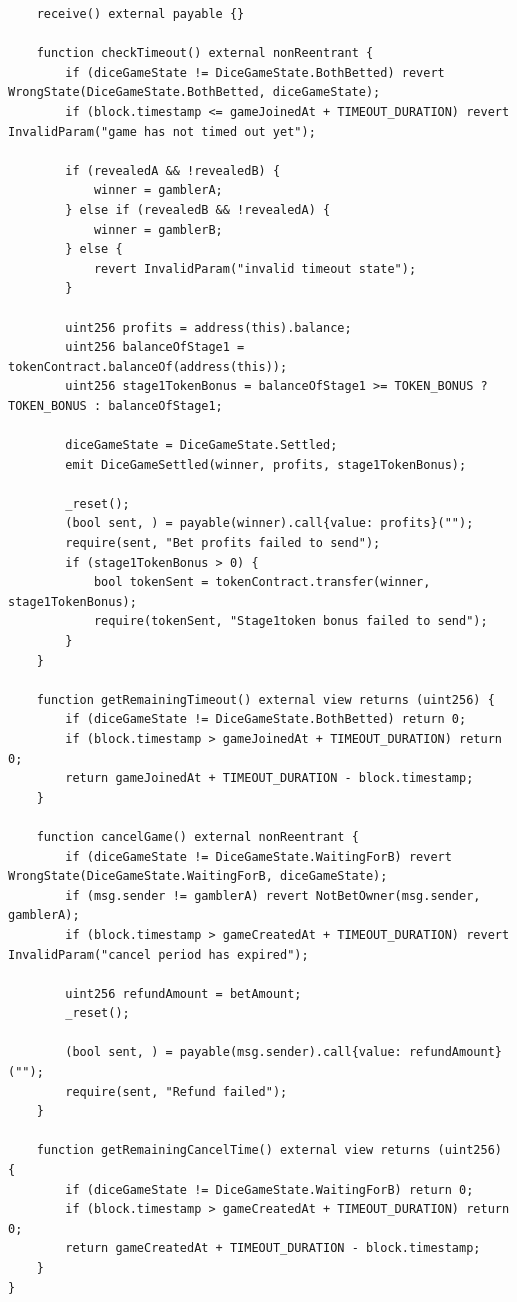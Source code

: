 \documentclass[10pt,a4paper]{article}
\begin{document}
\begin{lstlisting}
    receive() external payable {}

    function checkTimeout() external nonReentrant {
        if (diceGameState != DiceGameState.BothBetted) revert WrongState(DiceGameState.BothBetted, diceGameState);
        if (block.timestamp <= gameJoinedAt + TIMEOUT_DURATION) revert InvalidParam("game has not timed out yet");
        
        if (revealedA && !revealedB) {
            winner = gamblerA;
        } else if (revealedB && !revealedA) {
            winner = gamblerB;
        } else {
            revert InvalidParam("invalid timeout state");
        }
        
        uint256 profits = address(this).balance;
        uint256 balanceOfStage1 = tokenContract.balanceOf(address(this));
        uint256 stage1TokenBonus = balanceOfStage1 >= TOKEN_BONUS ? TOKEN_BONUS : balanceOfStage1;

        diceGameState = DiceGameState.Settled;
        emit DiceGameSettled(winner, profits, stage1TokenBonus);

        _reset();
        (bool sent, ) = payable(winner).call{value: profits}("");
        require(sent, "Bet profits failed to send");
        if (stage1TokenBonus > 0) {
            bool tokenSent = tokenContract.transfer(winner, stage1TokenBonus);
            require(tokenSent, "Stage1token bonus failed to send");
        }
    }
    
    function getRemainingTimeout() external view returns (uint256) {
        if (diceGameState != DiceGameState.BothBetted) return 0;
        if (block.timestamp > gameJoinedAt + TIMEOUT_DURATION) return 0;
        return gameJoinedAt + TIMEOUT_DURATION - block.timestamp;
    }
    
    function cancelGame() external nonReentrant {
        if (diceGameState != DiceGameState.WaitingForB) revert WrongState(DiceGameState.WaitingForB, diceGameState);
        if (msg.sender != gamblerA) revert NotBetOwner(msg.sender, gamblerA);
        if (block.timestamp > gameCreatedAt + TIMEOUT_DURATION) revert InvalidParam("cancel period has expired");
        
        uint256 refundAmount = betAmount;
        _reset();
        
        (bool sent, ) = payable(msg.sender).call{value: refundAmount}("");
        require(sent, "Refund failed");
    }
    
    function getRemainingCancelTime() external view returns (uint256) {
        if (diceGameState != DiceGameState.WaitingForB) return 0;
        if (block.timestamp > gameCreatedAt + TIMEOUT_DURATION) return 0;
        return gameCreatedAt + TIMEOUT_DURATION - block.timestamp;
    }
}
\end{lstlisting}
\end{document}
